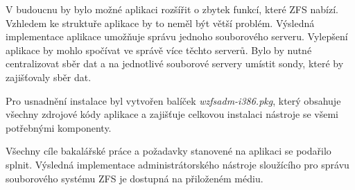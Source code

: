 V budoucnu by bylo možné aplikaci rozšířit o zbytek funkcí, které ZFS nabízí. Vzhledem ke struktuře aplikace by to neměl být větší problém. Výsledná implementace aplikace umožňuje správu jednoho souborového serveru. Vylepšení aplikace by mohlo spočívat ve správě více těchto serverů. Bylo by nutné centralizovat sběr dat a na jednotlivé souborové servery umístit sondy, které by zajišťovaly sběr dat.

Pro usnadnění instalace byl vytvořen balíček \emph{wzfsadm-i386.pkg}, který obsahuje všechny zdrojové kódy aplikace a zajišťuje celkovou instalaci nástroje se všemi potřebnými komponenty.

Všechny cíle bakalářské práce a požadavky stanovené na aplikaci se podařilo splnit. Výsledná implementace administrátorského nástroje sloužícího pro správu souborového systému ZFS je dostupná na přiloženém médiu.




